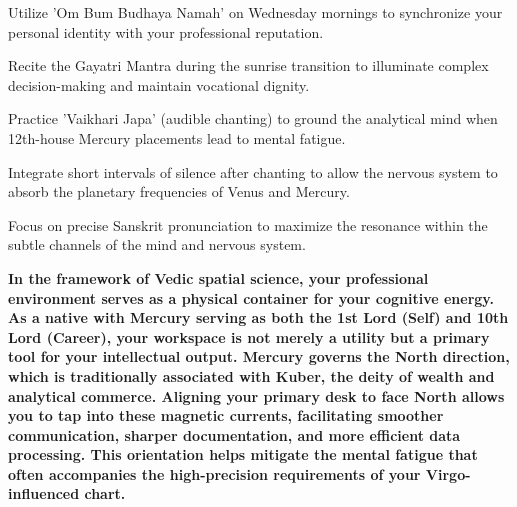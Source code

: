 \begin{diamondlist}
  \item {\fontsize{8.5}{12}\selectfont Utilize 'Om Bum Budhaya Namah' on Wednesday mornings to synchronize your personal identity with your professional reputation.}
  \item {\fontsize{8.5}{12}\selectfont Recite the Gayatri Mantra during the sunrise transition to illuminate complex decision-making and maintain vocational dignity.}
  \item {\fontsize{8.5}{12}\selectfont Practice 'Vaikhari Japa' (audible chanting) to ground the analytical mind when 12th-house Mercury placements lead to mental fatigue.}
  \item {\fontsize{8.5}{12}\selectfont Integrate short intervals of silence after chanting to allow the nervous system to absorb the planetary frequencies of Venus and Mercury.}
  \item {\fontsize{8.5}{12}\selectfont Focus on precise Sanskrit pronunciation to maximize the resonance within the subtle channels of the mind and nervous system.}
\end{diamondlist}


\label{topic62}

{\fontsize{9.5}{13.8}\selectfont\bfseries\color{DeepSlate} In the framework of Vedic spatial science, your professional environment serves as a physical container for your cognitive energy. As a native with Mercury serving as both the 1st Lord (Self) and 10th Lord (Career), your workspace is not merely a utility but a primary tool for your intellectual output. Mercury governs the North direction, which is traditionally associated with Kuber, the deity of wealth and analytical commerce. Aligning your primary desk to face North allows you to tap into these magnetic currents, facilitating smoother communication, sharper documentation, and more efficient data processing. This orientation helps mitigate the mental fatigue that often accompanies the high-precision requirements of your Virgo-influenced chart.}\par\vspace{2mm}

